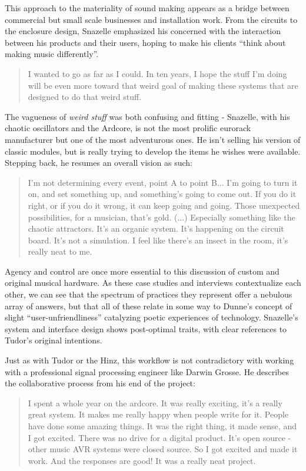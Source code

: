 This approach to the materiality of sound making appears as a bridge between commercial but small scale businesses and installation work. From the circuits to the enclosure design, Snazelle emphasized his concerned with the interaction between his products and their users, hoping to make his clients ``think about making music differently''. 

\begin{quote}
	I wanted to go as far as I could. In ten years, I hope the stuff I'm doing will be even more toward that weird goal of making these systems that are designed to do that weird stuff.
\end{quote}

The vagueness of \emph{weird stuff} was both confusing and fitting - Snazelle, with his chaotic oscillators and the Ardcore, is not the most prolific eurorack manufacturer but one of the most adventurous ones. He isn't selling his version of classic modules, but is really trying to develop the items he wishes were available. Stepping back, he resumes an overall vision as such: 

\begin{quote}
	I'm not determining every event, point A to point B... I'm going to turn it on, and set something up, and something's going to come out. If you do it right, or if you do it wrong, it can keep going and going. Those unexpected possibilities, for a musician, that's gold. (...) Especially something like the chaotic attractors. It’s an organic system. It’s happening on the circuit board. It’s not a simulation. I feel like there’s an insect in the room, it’s really neat to me.
\end{quote} 

Agency and control are once more essential to this discussion of custom and original musical hardware. As these case studies and interviews contextualize each other, we can see that the spectrum of practices they represent offer a nebulous array of answers, but that all of these relate in some way to Dunne's concept of slight ``user-unfriendliness'' catalyzing poetic experiences of technology. Snazelle's system and interface design shows post-optimal traits, with clear references to Tudor's original intentions. 

Just as with Tudor or the Hinz, this workflow is not contradictory with working with a professional signal processing engineer like Darwin Grosse. He describes the collaborative process from his end of the project: 

\begin{quote}
	I spent a whole year on the ardcore. It was really exciting, it’s a really great system. It makes me really happy when people write for it. People have done some amazing things. It was the right thing, it made sense, and I got excited. There was no drive for a digital product. It’s open source - other music AVR systems were closed source. So I got excited and made it work. And the responses are good! It was a really neat project.
\end{quote}

